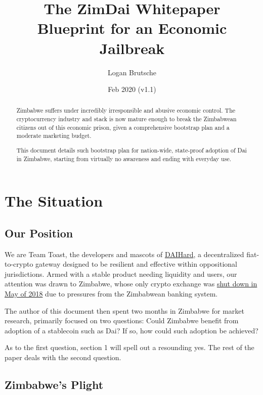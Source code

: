 \documentclass{article}
\title{The ZimDai Whitepaper\\
	\large Blueprint for an Economic Jailbreak
}
\date{Feb 2020 (v1.1)}
\author{Logan Brutsche}
\begin{document}

\maketitle
\begin{abstract}
	\setlength{\parskip}{1em}
	Zimbabwe suffers under incredibly irresponsible and abusive economic control. The cryptocurrency industry and stack is now mature enough to break the Zimbabwean citizens out of this economic prison, given a comprehensive bootstrap plan and a moderate marketing budget.
		
	This document details such bootstrap plan for nation-wide, state-proof adoption of Dai in Zimbabwe, starting from virtually no awareness and ending with everyday use.
\end{abstract}

\newpage
{}
\tableofcontents

\setlength{\parskip}{0.5em}

\newpage
{}
\section{The Situation} \label{situation}

\subsection{Our Position} \label{position}

We are Team Toast, the developers and mascots of \href{daihard.io}{DAIHard}, a decentralized fiat-to-crypto gateway designed to be resilient and effective within oppositional jurisdictions. Armed with a stable product needing liquidity and users, our attention was drawn to Zimbabwe, whose only crypto exchange was \href{https://www.techzim.co.zw/2018/05/golix-ordered-to-shut-down-by-rbz/}{shut down in May of 2018} due to pressures from the Zimbabwean banking system.

The author of this document then spent two months in Zimbabwe for market research, primarily focused on two questions: Could Zimbabwe benefit from adoption of a stablecoin such as Dai? If so, how could such adoption be achieved?

As to the first question, section 1 will spell out a resounding yes. The rest of the paper deals with the second question.

\subsection{Zimbabwe's Plight} \label{zimbabwe}
\end{document}

